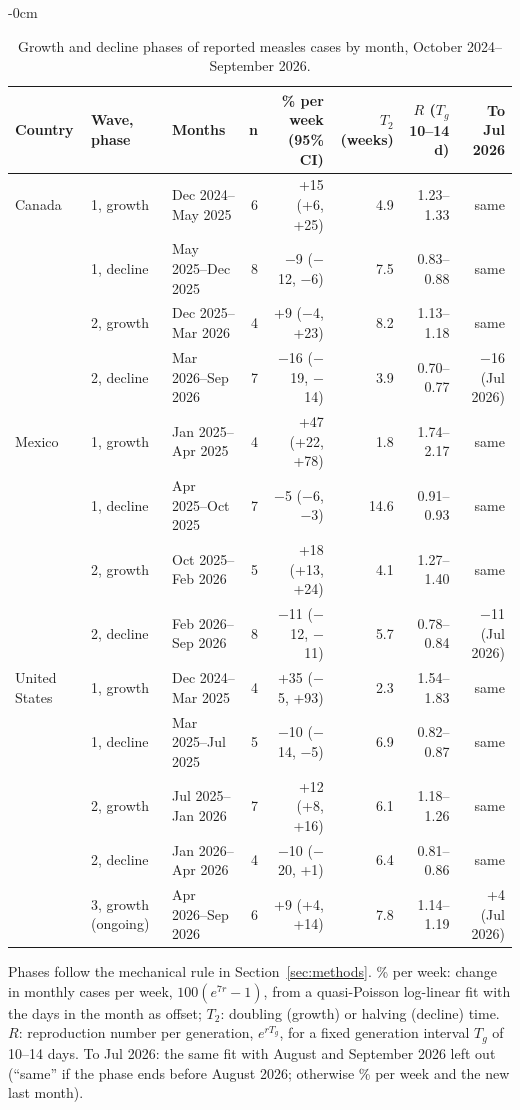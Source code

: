 \begin{table}[H]
\begin{adjustwidth}{-\extralength}{0cm}
\setlength{\tabcolsep}{4pt}
\caption{Growth and decline phases of reported measles cases by month, October 2024--September 2026.\label{tab:phases}}
\centering
\small
\begin{tabular}{lllrrrrr}
\toprule
\textbf{Country} & \textbf{Wave, phase} & \textbf{Months} & \textbf{n} & \textbf{\% per week (95\% CI)} & \textbf{$T_2$ (weeks)} & \textbf{$R$ ($T_g$ 10--14 d)} & \textbf{To Jul 2026}\\
\midrule
Canada & 1, growth & Dec 2024--May 2025 & 6 & +15 (+6, +25) & 4.9 & 1.23--1.33 & same\\
 & 1, decline & May 2025--Dec 2025 & 8 & $-$9 ($-$12, $-$6) & 7.5 & 0.83--0.88 & same\\
 & 2, growth & Dec 2025--Mar 2026 & 4 & +9 ($-$4, +23) & 8.2 & 1.13--1.18 & same\\
 & 2, decline & Mar 2026--Sep 2026 & 7 & $-$16 ($-$19, $-$14) & 3.9 & 0.70--0.77 & $-$16 (Jul 2026)\\
Mexico & 1, growth & Jan 2025--Apr 2025 & 4 & +47 (+22, +78) & 1.8 & 1.74--2.17 & same\\
 & 1, decline & Apr 2025--Oct 2025 & 7 & $-$5 ($-$6, $-$3) & 14.6 & 0.91--0.93 & same\\
 & 2, growth & Oct 2025--Feb 2026 & 5 & +18 (+13, +24) & 4.1 & 1.27--1.40 & same\\
 & 2, decline & Feb 2026--Sep 2026 & 8 & $-$11 ($-$12, $-$11) & 5.7 & 0.78--0.84 & $-$11 (Jul 2026)\\
United States & 1, growth & Dec 2024--Mar 2025 & 4 & +35 ($-$5, +93) & 2.3 & 1.54--1.83 & same\\
 & 1, decline & Mar 2025--Jul 2025 & 5 & $-$10 ($-$14, $-$5) & 6.9 & 0.82--0.87 & same\\
 & 2, growth & Jul 2025--Jan 2026 & 7 & +12 (+8, +16) & 6.1 & 1.18--1.26 & same\\
 & 2, decline & Jan 2026--Apr 2026 & 4 & $-$10 ($-$20, +1) & 6.4 & 0.81--0.86 & same\\
 & 3, growth (ongoing) & Apr 2026--Sep 2026 & 6 & +9 (+4, +14) & 7.8 & 1.14--1.19 & +4 (Jul 2026)\\
\bottomrule
\end{tabular}
\par\smallskip
{\raggedright\footnotesize Phases follow the mechanical rule in Section~\ref{sec:methods}. \% per week: change in monthly cases per week, $100(e^{7r}-1)$, from a quasi-Poisson log-linear fit with the days in the month as offset; $T_2$: doubling (growth) or halving (decline) time. $R$: reproduction number per generation, $e^{rT_g}$, for a fixed generation interval $T_g$ of 10--14 days. To Jul 2026: the same fit with August and September 2026 left out (``same'' if the phase ends before August 2026; otherwise \% per week and the new last month).\par}
\end{adjustwidth}
\end{table}
